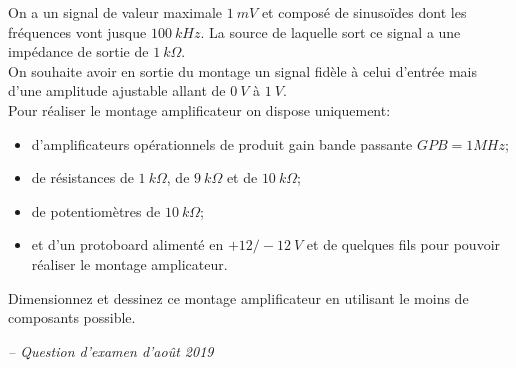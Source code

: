 {
On a un signal de valeur maximale $1\ mV$ et composé de sinusoïdes dont les fréquences vont jusque $100\ kHz$. La source de laquelle sort ce signal a une impédance de sortie de $1\ k\Omega$.\\
On souhaite avoir en sortie du montage un signal fidèle à celui d'entrée mais d'une amplitude ajustable allant de  $0\ V$ à $1\ V$.\\

Pour réaliser le montage amplificateur on dispose uniquement:
\begin{itemize}
    \item d'amplificateurs opérationnels de produit gain bande passante $GPB=1MHz$;
    \item de résistances de $1\ k\Omega$, de $9\ k\Omega$ et de $10\ k\Omega$;
    \item de potentiomètres de $10\ k\Omega$;
    \item et d'un protoboard alimenté en $+12/-12\ V$ et de quelques fils pour pouvoir réaliser le montage amplicateur.
\end{itemize}

Dimensionnez et dessinez ce montage amplificateur en utilisant le moins de composants possible.

\textit{-- Question d'examen d'août 2019}
}
